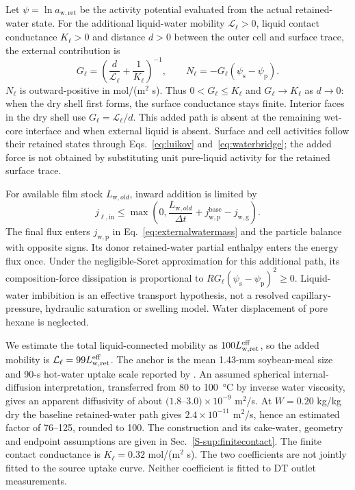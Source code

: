 Let $\psi=\ln a_{\mathrm{w,ret}}$ be the activity potential evaluated from
the actual retained-water state. For the additional liquid-water mobility
$\mathcal L_\ell>0$, liquid contact conductance $K_\ell>0$ and distance $d>0$
between the outer cell and surface trace, the external contribution is
\begin{equation}
G_\ell=\left(\frac{d}{\mathcal L_\ell}+\frac{1}{K_\ell}\right)^{-1},
\qquad N_\ell=-G_\ell(\psi_{\mathrm s}-\psi_{\mathrm p}).
\label{eq:finitecontact}
\end{equation}
$N_\ell$ is outward-positive in mol/(m$^2$ s). Thus
$0<G_\ell\le K_\ell$ and $G_\ell\to K_\ell$ as $d\to0$:
when the dry shell first forms, the surface conductance stays finite.
Interior faces in the dry shell use $G_\ell=\mathcal L_\ell/d$.
This added path is absent at the remaining wet-core interface and when
external liquid is absent. Surface and cell activities follow their
retained states through Eqs.~\eqref{eq:luikov} and~\eqref{eq:waterbridge}; the added force is not obtained by
substituting unit pure-liquid activity for the retained surface trace.

For available film stock $L_{\mathrm w,old}$, inward addition is limited by
\begin{equation}
j_{\ell,\mathrm{in}}\le
\max\!\left(0,\frac{L_{\mathrm w,old}}{\Delta t}
+j_{\mathrm w,\mathrm p}^{\mathrm{base}}-j_{\mathrm w,\mathrm g}\right).
\label{eq:liquidstocksupply}
\end{equation}
The final flux enters $j_{\mathrm w,\mathrm p}$ in
Eq.~\eqref{eq:externalwatermass} and the particle balance with opposite
signs. Its donor retained-water partial enthalpy enters the energy flux
once. Under the negligible-Soret approximation for this additional path,
its composition-force dissipation is proportional to
$R G_\ell(\psi_{\mathrm s}-\psi_{\mathrm p})^2\ge0$.
Liquid-water imbibition is an effective transport hypothesis, not a
resolved capillary-pressure, hydraulic saturation or swelling model.
Water displacement of pore hexane is neglected.

We estimate the total liquid-connected mobility as $100L_{\mathrm{w,ret}}^{\mathrm{eff}}$, so the
added mobility is $\mathcal L_\ell=99L_{\mathrm{w,ret}}^{\mathrm{eff}}$. The anchor is the mean
1.43-mm soybean-meal size and 90-s hot-water uptake scale reported by
\citet{hemmingsen2008water}. An assumed spherical internal-diffusion
interpretation, transferred from 80 to \SI{100}{\celsius} by inverse water
viscosity, gives an apparent diffusivity of about
$(1.8$--$3.0)\times10^{-9}$ m$^2$/s. At $W=0.20$ kg/kg dry the baseline
retained-water path gives $2.4\times10^{-11}$ m$^2$/s, hence an estimated
factor of 76--125, rounded to 100. The construction and its cake-water,
geometry and endpoint assumptions are given in Sec.~\ref*{S-sup:finitecontact}.
The finite contact conductance is $K_\ell=0.32$ mol/(m$^2$ s).
The two coefficients are not jointly fitted to the source uptake curve.
Neither coefficient is fitted to DT outlet measurements.

